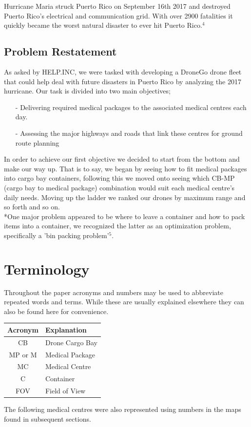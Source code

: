 \documentclass[a4paper,12pt]{article}
\begin{document}
Hurricane Maria struck Puerto Rico on September 16th 2017 and destroyed Puerto Rico's electrical and communication grid. With over 2900 fatalities it quickly became
the worst natural disaster to ever hit Puerto Rico.$^4$

\subsection{Problem Restatement}
As asked by HELP.INC, we were tasked with developing a DroneGo drone fleet that could help deal with future disasters in
Puerto Rico by analyzing the 2017 hurricane. Our task is divided into two main objectives;
\begin{itemize}
\item[-]Delivering required medical packages to the associated medical centres each day.
\item[-]Assessing the major highways and roads that link these centres for ground route planning
\end{itemize}
In order to achieve our first objective we decided to start from the bottom and make our way up. That is to say, we began by seeing how to fit medical packages into cargo bay containers, following this
we moved onto seeing which CB-MP (cargo bay to medical package) combination would suit each medical centre's daily needs. Moving up the ladder we ranked our drones by maximum range and so forth and so on.
\\*One major problem appeared to be where to leave a container and how to pack items into a container, we recognized the latter as an optimization problem, specifically a 'bin packing problem'$^5$.

\section{Terminology}
Throughout the paper acronyms and numbers may be used to abbreviate repeated words and terms. While these are usually explained elsewhere they can also be found here for convenience.

\begin{center}
\begin{tabular}{ |c|l| }
\hline
 \bf{Acronym} & \bf{Explanation}  \\\hline
 CB & Drone Cargo Bay \\
 MP or M & Medical Package \\
 MC & Medical Centre\\
 C & Container \\
 FOV & Field of View \\
 \hline
\end{tabular}
\end{center}
The following medical centres were also represented using numbers in the maps found in subsequent sections.
\end{document}
